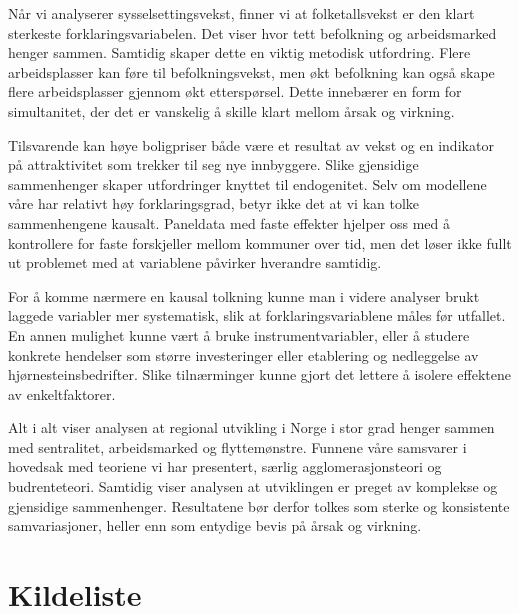 \documentclass[
  norsk,
  letterpaper,
  DIV=11,
  numbers=noendperiod]{scrartcl}
\begin{document}
Når vi analyserer sysselsettingsvekst, finner vi at folketallsvekst er
den klart sterkeste forklaringsvariabelen. Det viser hvor tett
befolkning og arbeidsmarked henger sammen. Samtidig skaper dette en
viktig metodisk utfordring. Flere arbeidsplasser kan føre til
befolkningsvekst, men økt befolkning kan også skape flere arbeidsplasser
gjennom økt etterspørsel. Dette innebærer en form for simultanitet, der
det er vanskelig å skille klart mellom årsak og virkning.

Tilsvarende kan høye boligpriser både være et resultat av vekst og en
indikator på attraktivitet som trekker til seg nye innbyggere. Slike
gjensidige sammenhenger skaper utfordringer knyttet til endogenitet.
Selv om modellene våre har relativt høy forklaringsgrad, betyr ikke det
at vi kan tolke sammenhengene kausalt. Paneldata med faste effekter
hjelper oss med å kontrollere for faste forskjeller mellom kommuner over
tid, men det løser ikke fullt ut problemet med at variablene påvirker
hverandre samtidig.

For å komme nærmere en kausal tolkning kunne man i videre analyser brukt
laggede variabler mer systematisk, slik at forklaringsvariablene måles
før utfallet. En annen mulighet kunne vært å bruke instrumentvariabler,
eller å studere konkrete hendelser som større investeringer eller
etablering og nedleggelse av hjørnesteinsbedrifter. Slike tilnærminger
kunne gjort det lettere å isolere effektene av enkeltfaktorer.

Alt i alt viser analysen at regional utvikling i Norge i stor grad
henger sammen med sentralitet, arbeidsmarked og flyttemønstre. Funnene
våre samsvarer i hovedsak med teoriene vi har presentert, særlig
agglomerasjonsteori og budrenteteori. Samtidig viser analysen at
utviklingen er preget av komplekse og gjensidige sammenhenger.
Resultatene bør derfor tolkes som sterke og konsistente samvariasjoner,
heller enn som entydige bevis på årsak og virkning.

\section*{Kildeliste}\label{kildeliste}
\end{document}
